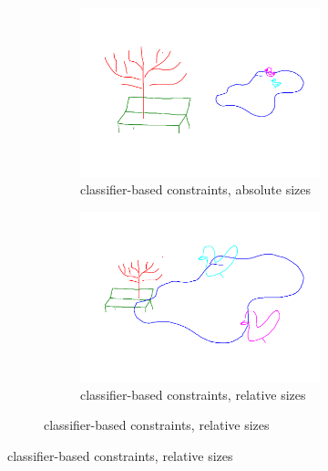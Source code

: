 \begin{figure}[ht]
\begin{subfigure}{\textwidth}
\begin{subfigure}[t]{0.45\textwidth}
            \end{subfigure}
        \end{subfigure}
        \begin{subfigure}{\textwidth}
            \centering
            \caption{(2) }
            \begin{subfigure}{0.45\textwidth}
                \includegraphics[width=\textwidth]{figures/drawing_2_ca.pdf}
                \caption{classifier-based constraints, absolute sizes}
            \end{subfigure} 
            \hfill
            \begin{subfigure}{0.45\textwidth}
                \includegraphics[width=\textwidth]{figures/drawing_2_cr.pdf}
                \caption{classifier-based constraints, relative sizes}

\end{subfigure}
\end{subfigure}
\end{figure}
